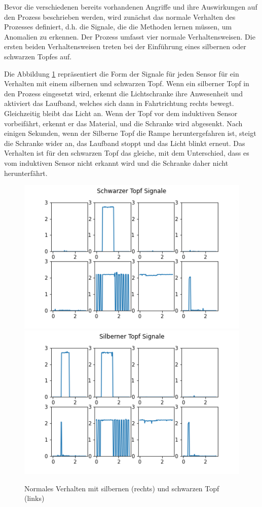 \documentclass[12pt,a4paper]{scrartcl}
\numberwithin{equation}{section}
\begin{document}
Bevor die verschiedenen bereits vorhandenen Angriffe und ihre Auswirkungen auf den Prozess beschrieben werden, wird zunächst das normale Verhalten des Prozesses definiert, d.h. die Signale, die die Methoden lernen müssen, um Anomalien zu erkennen.
Der Prozess umfasst vier normale Verhaltensweisen. Die ersten beiden Verhaltensweisen treten bei der Einführung eines silbernen oder schwarzen Topfes auf. 

Die Abbildung \ref{regroup} repräsentiert die Form der Signale für jeden Sensor für ein Verhalten mit einem silbernen und schwarzen Topf. Wenn ein silberner Topf in den Prozess eingesetzt wird, erkennt die Lichtschranke ihre Anwesenheit und aktiviert das Laufband, welches sich dann in Fahrtrichtung rechts bewegt. Gleichzeitig bleibt das Licht an. Wenn der Topf vor dem induktiven Sensor vorbeifährt, erkennt er das Material, und die Schranke wird abgesenkt. Nach einigen Sekunden, wenn der Silberne Topf die Rampe heruntergefahren ist, steigt die Schranke wider an, das Laufband stoppt und das Licht blinkt erneut. Das Verhalten ist für den schwarzen Topf das gleiche, mit dem Unterschied, dass es vom induktiven Sensor nicht erkannt wird und die Schranke daher nicht herunterfährt. 

\begin{figure}[ht!]
	\centering
	  \includegraphics[scale=0.5]{black_signal.png}
	  \includegraphics[scale=0.5]{silver_signal.png}
	  \caption{Normales Verhalten mit silbernen (rechts) und schwarzen Topf (links)}
	 \label{regroup}
\end{figure}
\end{document}
